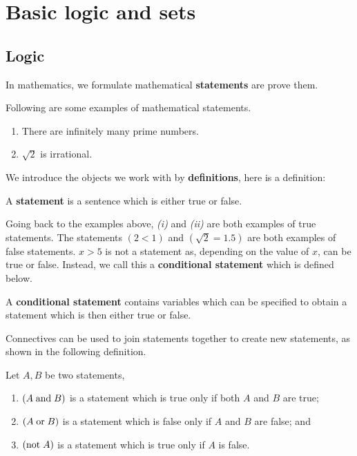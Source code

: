 \chapter{Basic logic and sets}

\section{Logic}

In mathematics, we formulate mathematical \textbf{statements} are prove them.

\begin{example}
    Following are some examples of mathematical statements.
    \begin{enumerate}
        \item There are infinitely many prime numbers.
        \item $\sqrt2$ is irrational.
    \end{enumerate}
\end{example}

We introduce the objects we work with by \textbf{definitions}, here is a definition:

\begin{definition}
    A \textbf{statement} is a sentence which is either true or false.
\end{definition}

Going back to the examples above, \emph{(i)} and \emph{(ii)} are both examples of true statements. The statements $(2 < 1)$ and $(\sqrt2=1.5)$ are both examples of false statements. $x>5$ is not a statement as, depending on the value of $x$, can be true or false. Instead, we call this a \textbf{conditional statement} which is defined below.

\begin{definition}\label{def:conditional_statement}
    A \textbf{conditional statement} contains variables which can be specified to obtain a statement which is then either true or false.
\end{definition}

Connectives can be used to join statements together to create new statements, as shown in the following definition.

\begin{definition}
    Let $A,B$ be two statements,
    \begin{enumerate}
        \item $(A\;\text{and}\; B)$ is a statement which is true only if both $A$ and $B$ are true;
        \item $(A\;\text{or}\; B)$ is a statement which is false only if $A$ and $B$ are false; and
        \item $(\text{not}\; A)$ is a statement which is true only if $A$ is false.
    \end{enumerate}
\end{definition}

